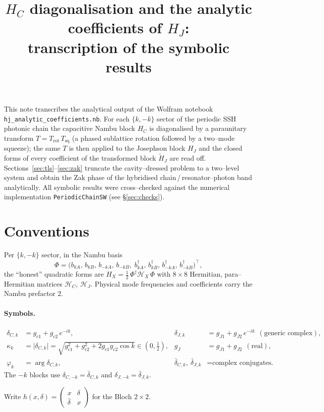 \documentclass[11pt]{article}
\title{$H_C$ diagonalisation and the analytic coefficients of $H_J$:\\
       transcription of the symbolic results}
\author{}
\date{}
\newcommand{\dC}{\delta_{C,k}}
\newcommand{\dJ}{\delta_{J,k}}
\newcommand{\dCb}{\bar\delta_{C,k}}
\newcommand{\dJb}{\bar\delta_{J,k}}
\newcommand{\kk}{\kappa_k}
\newcommand{\ph}{\varphi_k}
\newcommand{\gJ}{g_J}
\newcommand{\Tr}{T_{\mathrm{rot}}}
\newcommand{\Tsq}{T_{\mathrm{sq}}}
\begin{document}
\maketitle

\noindent
This note transcribes the analytical output of the Wolfram notebook
\texttt{hj\_analytic\_coefficients.nb}. For each $\{k,-k\}$ sector of the
periodic SSH photonic chain the capacitive Nambu block $H_C$ is diagonalised by a
paraunitary transform $T=\Tr\,\Tsq$ (a phased sublattice rotation followed by a
two--mode squeeze); the same $T$ is then applied to the Josephson block $H_J$ and
the closed forms of every coefficient of the transformed block $\tilde H_J$ are
read off. Sections~\ref{sec:tls}--\ref{sec:zak} truncate the cavity--dressed
problem to a two--level system and obtain the Zak phase of the hybridised
chain\,/\,resonator--photon band analytically. All symbolic results were
cross--checked against the numerical implementation
\texttt{PeriodicChainSW} (see \S\ref{sec:checks}).

\section{Conventions}\label{sec:conv}

Per $\{k,-k\}$ sector, in the Nambu basis
\[
  \Phi=\bigl(b_{kA},\,b_{kB},\,b_{-kA},\,b_{-kB},\;
             b_{kA}^{\dagger},\,b_{kB}^{\dagger},\,b_{-kA}^{\dagger},\,b_{-kB}^{\dagger}\bigr)^{\!\top},
\]
the ``honest'' quadratic forms are $H_X=\tfrac12\,\Phi^{\dagger}\mathcal H_X\,\Phi$
with $8\times8$ Hermitian, para--Hermitian matrices $\mathcal H_C$, $\mathcal H_J$.
Physical mode frequencies and coefficients carry the Nambu prefactor $2$.

\paragraph{Symbols.}
\begin{align*}
  \dC &= g_{c1}+g_{c2}\,e^{-ik}, &
  \dJ &= g_{J1}+g_{J2}\,e^{-ik}\ \ (\text{generic complex}), \\
  \kk &= \lvert\dC\rvert=\sqrt{g_{c1}^{2}+g_{c2}^{2}+2g_{c1}g_{c2}\cos k}\in(0,\tfrac12), &
  \gJ &= g_{J1}+g_{J2}\ \ (\text{real}), \\
  \ph &= \arg\dC, &
  \dCb,\ \dJb &= \text{complex conjugates.}
\end{align*}
The $-k$ blocks use $\delta_{C,-k}=\dCb$ and $\delta_{J,-k}=\dJb$.

Write $h(x,\delta)=\left(\begin{smallmatrix} x & \delta\\ \bar\delta & x\end{smallmatrix}\right)$ for the Bloch $2\times2$.
\end{document}
